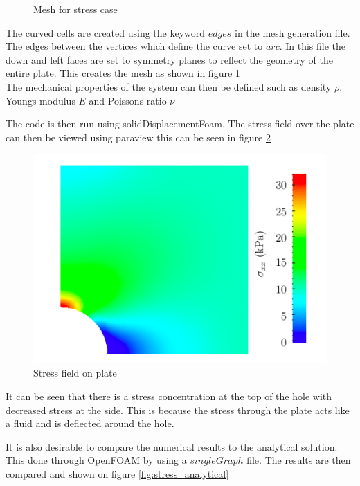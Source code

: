 \documentclass[]{report}
\begin{document}
\begin{figure}[h]
\begin{minipage}[h]{0.5\textwidth}
	\caption{Mesh for stress case}
	\label{fig:stress_mesh}
	\end{minipage}
\end{figure}

The curved cells are created using the keyword $edges$ in the mesh generation file. The edges between the vertices which define the curve set to $arc$. In this file the down and left faces are set to symmetry planes to reflect the geometry of the entire plate. This creates the mesh as shown in figure \ref{fig:stress_mesh}
\\
The mechanical properties of the system can then be defined such as density $\rho$, Youngs modulus $E$ and Poissons ratio $\nu$

The code is then run using solidDisplacementFoam. The stress field over the plate can then be viewed using paraview this can be seen in figure \ref{fig:stress_field}

\begin{figure}
	\centering
	\includegraphics[scale=0.5]{stress_field}
	\caption{Stress field on plate}
	\label{fig:stress_field}
\end{figure}

It can be seen that there is a stress concentration at the top of the hole with decreased stress at the side. This is because the stress through the plate acts like a fluid and is deflected around the hole. 

It is also desirable to compare the numerical results to the analytical solution. This done through OpenFOAM by using a $singleGraph$ file.
The results are then compared and shown on figure \ref{fig:stress_analytical} 
\end{document}
